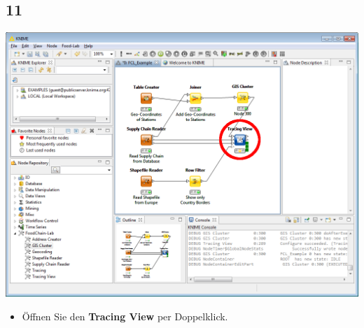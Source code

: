 \documentclass{beamer}
\begin{document}
\subsection{11}
\begin{frame}
	\begin{center}
  		\includegraphics[height=0.6\textheight]{11.png}
	\end{center}
	\begin{itemize}
		\item Öffnen Sie den \textbf{Tracing View} per Doppelklick.
	\end{itemize}
\end{frame}
\end{document}
